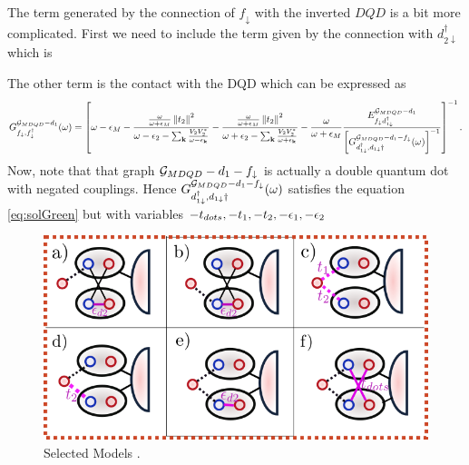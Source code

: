  
The term generated by the connection of $f_{\downarrow}$  with the inverted $DQD$ is a bit more complicated. First we need to include the term given by the connection with  $d_{2\downarrow}^\dagger$ which is 

The other term is the contact with the DQD which can be expressed as 
\begin{equation}
    G_{f_{\downarrow},f_{\downarrow}^{\dagger}}^{ \mathcal{G}_{MDQD}-d_{1}} (\omega)=\left[\omega-\epsilon_{M}-\frac{\frac{\omega}{\omega+\epsilon_{M}}\left\Vert t_{2}\right\Vert ^{2}}{\omega-\epsilon_{2}-\sum_{\mathbf{k}}\frac{V_{2}V_{2}^{*}}{\omega-\epsilon_{\mathbf{k}}}}-\frac{\frac{\omega}{\omega+\epsilon_{M}}\left\Vert t_{2}\right\Vert ^{2}}{\omega+\epsilon_{2}-\sum_{\mathbf{k}}\frac{V_{2}V_{2}^{*}}{\omega+\epsilon_{\mathbf{k}}}}-\frac{\omega}{\omega+\epsilon_{M}}\frac{E_{f_{\downarrow}d_{1\downarrow}^\dagger}^{\mathcal{G}_{MDQD}-d_1}}{\left[G_{d_{1\downarrow}^{\dagger},d_{1\downarrow}{\dagger}}^{ \mathcal{G}_{MDQD}-d_{1}-f_{\downarrow}} (\omega)\right]^{-1}}\right]^{-1}.
\end{equation}
Now, note that that graph $\mathcal{G}_{MDQD}-d_{1}-f_{\downarrow}$ is actually a double quantum dot with negated couplings. Hence  $G_{d_{1\downarrow}^{\dagger},d_{1\downarrow}{\dagger}}^{ \mathcal{G}_{MDQD}-d_{1}-f_{\downarrow}} (\omega)$  satisfies the equation \eqref{eq:solGreen} but with variables $-t_{dots}, -t_1 , -t_2, -\epsilon_{1}  , -\epsilon_{2}$


\begin{figure}[H]
\centering
\includegraphics[scale=0.4]{IMAGES/Graphs/Models.png}
\caption{\label{fig:Models}Selected Models .} 
\end{figure}

